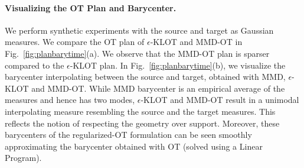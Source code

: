 \paragraph{Visualizing the OT Plan and Barycenter.}
We perform synthetic experiments with the source and target as Gaussian measures. We compare the OT plan of $\epsilon$-KLOT and MMD-OT in Fig.~\ref{fig:planbarytime}(a). We observe that the MMD-OT plan is sparser compared to the $\epsilon$-KLOT plan. In Fig.~\ref{fig:planbarytime}(b), we visualize the barycenter interpolating between the source and target, obtained with MMD, $\epsilon$-KLOT and MMD-OT. While MMD barycenter is an empirical average of the measures and hence has two modes, $\epsilon$-KLOT and MMD-OT result in a unimodal interpolating measure resembling the source and the target measures. This reflects the notion of respecting the geometry over support. Moreover, these barycenters of the regularized-OT formulation can be seen smoothly approximating the barycenter obtained with OT (solved using a Linear Program).
